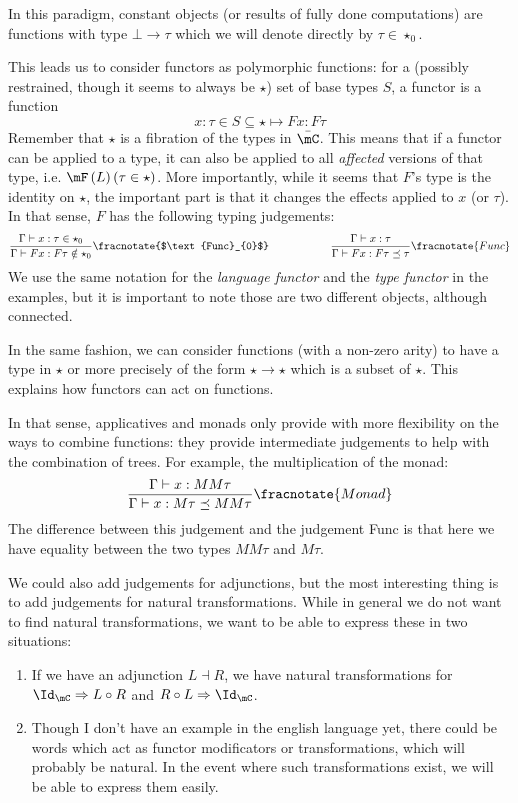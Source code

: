 \documentclass[math, english, info]{cours}
\begin{document}
In this paradigm, constant objects (or results of fully done computations) are functions with type $\bot \to \tau$ which we will denote directly by $\tau \in \star_{0}$.

This leads us to consider functors as polymorphic functions: for a (possibly restrained, though it seems to always be $\star$) set of base types $S$, a functor is a function
\begin{equation*}
	x: \tau\in S\subseteq \star \mapsto F x: F\tau
\end{equation*}
Remember that $\star$ is a fibration of the types in $\bar{\mC}$.
This means that if a functor can be applied to a type, it can also be applied to all \emph{affected} versions of that type, i.e. $\mF\left( L \right)(\tau\in \star)$.
More importantly, while it seems that $F$'s type is the identity on $\star$, the important part is that it changes the effects applied to $x$ (or $\tau$).
In that sense, $F$ has the following typing judgements:
\begin{equation*}
	\frac{\Gamma\vdash x: \tau \in \star_{0}}{\Gamma\vdash F x: F\tau \notin \star_{0}}\fracnotate{$\text{Func}_{0}$} \hspace{2cm} \frac{\Gamma\vdash x: \tau}{\Gamma\vdash Fx : F\tau\preceq \tau}\fracnotate{Func}
\end{equation*}
We use the same notation for the \emph{language functor} and the \emph{type functor} in the examples, but it is important to note those are two different objects, although connected.

In the same fashion, we can consider functions (with a non-zero arity) to have a type in $\star$ or more precisely of the form $\star \to \star$ which is a subset of $\star$.
This explains how functors can act on functions.

In that sense, applicatives and monads only provide with more flexibility on the ways to combine functions:
they provide intermediate judgements to help with the combination of trees. For example, the multiplication of the monad:
\begin{equation*}
	\frac{\Gamma\vdash x: MM\tau}{\Gamma\vdash x: M\tau \preceq MM\tau}\fracnotate{Monad}
\end{equation*}
The difference between this judgement and the judgement Func is that here we have equality between the two types $MM\tau$ and $M\tau$.

We could also add judgements for adjunctions, but the most interesting thing is to add judgements for natural transformations.
While in general we do not want to find natural transformations, we want to be able to express these in two situations:
\begin{enumerate}
	\item If we have an adjunction $L\dashv R$, we have natural transformations for $\Id_{\mC} \Rightarrow L \circ R$ and $R\circ L \Rightarrow \Id_{\mC}$.
	\item Though I don't have an example in the english language yet, there could be words which act as functor modificators or transformations, which will probably be natural.
		In the event where such transformations exist, we will be able to express them easily.
\end{enumerate}
\end{document}
